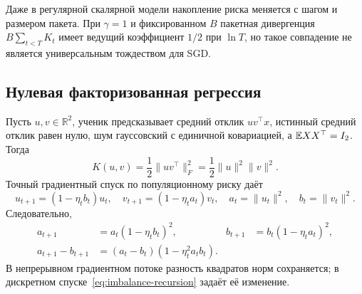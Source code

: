 Даже в регулярной скалярной модели накопление риска меняется с шагом и
размером пакета. При $\gamma=1$ и фиксированном $B$ пакетная дивергенция
$B\sum_{t<T}K_t$ имеет ведущий коэффициент $1/2$ при $\ln T$, но такое
совпадение не является универсальным тождеством для SGD.

\subsection{Нулевая факторизованная регрессия}

Пусть $u,v\in\mathbb R^2$, ученик предсказывает средний отклик $uv^\top x$,
истинный средний отклик равен нулю, шум гауссовский с единичной ковариацией,
а $\mathbb E XX^\top=I_2$. Тогда
\begin{equation}
 K(u,v)=\frac12\|uv^\top\|_F^2
       =\frac12\|u\|^2\|v\|^2.
 \label{eq:factor-risk}
\end{equation}
Точный градиентный спуск по популяционному риску даёт
\[
 u_{t+1}=(1-\eta_tb_t)u_t,\quad
 v_{t+1}=(1-\eta_ta_t)v_t,\quad
 a_t=\|u_t\|^2,\quad b_t=\|v_t\|^2.
\]
Следовательно,
\begin{align}
 a_{t+1}&=a_t(1-\eta_tb_t)^2,&
 b_{t+1}&=b_t(1-\eta_ta_t)^2,
 \label{eq:norm-recursion}\\
 a_{t+1}-b_{t+1}&=(a_t-b_t)(1-\eta_t^2a_tb_t).
 \label{eq:imbalance-recursion}
\end{align}
В непрерывном градиентном потоке разность квадратов норм сохраняется;
в дискретном спуске~\eqref{eq:imbalance-recursion} задаёт её изменение.

